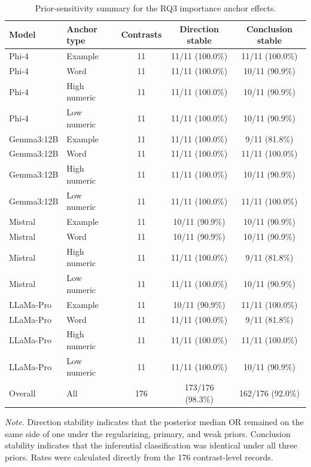\begin{table}[tbp]
\caption{Prior-sensitivity summary for the RQ3 importance anchor effects.}
\label{tab:rq3_importance_prior_sensitivity}
\begin{tabular}{llccc}
\toprule
Model & Anchor type & Contrasts & Direction stable & Conclusion stable \\
\midrule
Phi-4 & Example & 11 & 11/11 (100.0\%) & 11/11 (100.0\%) \\
Phi-4 & Word & 11 & 11/11 (100.0\%) & 10/11 (90.9\%) \\
Phi-4 & High numeric & 11 & 11/11 (100.0\%) & 10/11 (90.9\%) \\
Phi-4 & Low numeric & 11 & 11/11 (100.0\%) & 10/11 (90.9\%) \\
Gemma3:12B & Example & 11 & 11/11 (100.0\%) & 9/11 (81.8\%) \\
Gemma3:12B & Word & 11 & 11/11 (100.0\%) & 11/11 (100.0\%) \\
Gemma3:12B & High numeric & 11 & 11/11 (100.0\%) & 10/11 (90.9\%) \\
Gemma3:12B & Low numeric & 11 & 11/11 (100.0\%) & 11/11 (100.0\%) \\
Mistral & Example & 11 & 10/11 (90.9\%) & 10/11 (90.9\%) \\
Mistral & Word & 11 & 10/11 (90.9\%) & 10/11 (90.9\%) \\
Mistral & High numeric & 11 & 11/11 (100.0\%) & 9/11 (81.8\%) \\
Mistral & Low numeric & 11 & 11/11 (100.0\%) & 10/11 (90.9\%) \\
LLaMa-Pro & Example & 11 & 10/11 (90.9\%) & 11/11 (100.0\%) \\
LLaMa-Pro & Word & 11 & 11/11 (100.0\%) & 9/11 (81.8\%) \\
LLaMa-Pro & High numeric & 11 & 11/11 (100.0\%) & 11/11 (100.0\%) \\
LLaMa-Pro & Low numeric & 11 & 11/11 (100.0\%) & 10/11 (90.9\%) \\
Overall & All & 176 & 173/176 (98.3\%) & 162/176 (92.0\%) \\
\bottomrule
\end{tabular}

\noindent\begin{minipage}{\linewidth}
\footnotesize\textit{Note.} Direction stability indicates that the posterior median OR remained on the same side of one under the regularizing, primary, and weak priors. Conclusion stability indicates that the inferential classification was identical under all three priors. Rates were calculated directly from the 176 contrast-level records.
\end{minipage}

\end{table}
